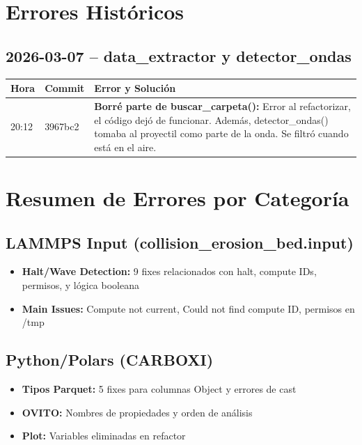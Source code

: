 \documentclass[12pt,a4paper]{article}
\begin{document}
\section*{Errores Históricos}

\subsection*{2026-03-07 -- data\_extractor y detector\_ondas}

\begin{table}[H]
	\centering
	\begin{tabular}{@{}llp{9cm}@{}}
		\toprule
		\textbf{Hora} & \textbf{Commit} & \textbf{Error y Solución}                                                                                                                                                                             \\
		\midrule
		20:12         & 3967bc2         & \textbf{Borré parte de buscar\_carpeta():} Error al refactorizar, el código dejó de funcionar. Además, detector\_ondas() tomaba al proyectil como parte de la onda. Se filtró cuando está en el aire. \\
		\bottomrule
	\end{tabular}
\end{table}

\section*{Resumen de Errores por Categoría}

\subsection*{LAMMPS Input (collision\_erosion\_bed.input)}
\begin{itemize}[leftmargin=*]
	\item \textbf{Halt/Wave Detection:} 9 fixes relacionados con halt, compute IDs, permisos, y lógica booleana
	\item \textbf{Main Issues:} Compute not current, Could not find compute ID, permisos en /tmp
\end{itemize}

\subsection*{Python/Polars (CARBOXI)}
\begin{itemize}[leftmargin=*]
	\item \textbf{Tipos Parquet:} 5 fixes para columnas Object y errores de cast
	\item \textbf{OVITO:} Nombres de propiedades y orden de análisis
	\item \textbf{Plot:} Variables eliminadas en refactor
\end{itemize}
\end{document}
